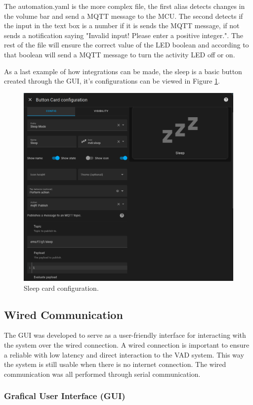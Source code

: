 The automation.yaml is the more complex file, the first alias detects changes in the volume bar and send a MQTT message to the MCU. The second detects if the input in the text box is a number if it is sends the MQTT message, if not sends a notification saying "Invalid input! Please enter a positive integer.". The rest of the file will ensure the correct value of the LED boolean and according to that boolean will send a MQTT message to turn the activity LED off or on.

As a last example of how integrations can be made, the sleep is a basic button created through the GUI, it's configurations can be viewed in Figure \ref{fig:SleepCard}.

\begin{figure}[H]
    \centering
    \includegraphics*[scale = 0.3]{Images/SleepCard.png}
    \caption{Sleep card configuration.}
    \label{fig:SleepCard}
\end{figure}

\subsection{Wired Communication}

The GUI was developed to serve as a user-friendly interface for interacting with the system over the wired connection. A wired connection is important to ensure a reliable with low latency and direct interaction to the VAD system. This way the system is still usable when there is no internet connection. The wired communication was all performed through serial communication.

\subsubsection{Grafical User Interface (GUI) }

